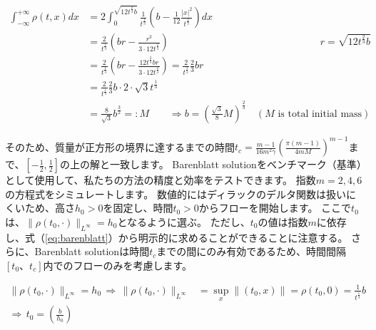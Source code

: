 \documentclass{jsarticle}
\theoremstyle{definition}
\begin{document}
\begin{align*}
    \int^{+\infty}_{-\infty} \rho(t, x)dx &= 2 \int^{\sqrt{12t^{\frac{2}{3}}b}}_0 \frac{1}{t^{\frac{1}{3}}}\left(b - \frac{1}{12} \frac{|x|^2}{t^{\frac{2}{3}}}\right)dx\\
                                            &= \frac{2}{t^{\frac{1}{3}}}\left(b r - \frac{r^3}{3 \cdot 12 t^{\frac{2}{3}}}\right) & r = \sqrt{12t^{\frac{2}{3}}b}\\
                                            &= \frac{2}{t^{\frac{1}{3}}}\left(b r - \frac{12t^{\frac{2}{3}}b r}{3 \cdot 12 t^{\frac{2}{3}}}\right) = \frac{2}{t^{\frac{1}{3}}}\frac{2}{3}br\\
                                            &= \frac{2}{t^{\frac{1}{3}}}\frac{2}{3}b \cdot 2\cdot \sqrt{3} t^{\frac{1}{3}}\\
                                            &= \frac{8}{\sqrt{3}}b^{\frac{3}{2}} =: M  \qquad \Longrightarrow b = \left(\frac{\sqrt{3}}{8} M \right)^{\frac{2}{3}} \quad(M \text{ is total initial mass})
\end{align*}



そのため、質量が正方形の境界に達するまでの時間$t_c = \frac{m - 1}{16 m^2 \gamma}(\frac{\pi(m - 1)}{4mM})^{m - 1}$まで、$[- \frac{1}{2}, \frac{1}{2}]$の上の解と一致します。
Barenblatt solutionをベンチマーク（基準）として使用して、私たちの方法の精度と効率をテストできます。
指数$m = 2, 4, 6$の方程式をシミュレートします。
数値的にはディラックのデルタ関数は扱いにくいため、高さ$h_0 > 0$を固定し、時間$t_0 > 0$からフローを開始します。
{\color{red}
    ここで$t_0$は、$\|\rho(t_0, \cdot)\|_{L^\infty} = h_0$となるように選ぶ。
}
ただし、$t_0$の値は指数$m$に依存し、式（\ref{eq:barenblatt}）から明示的に求めることができることに注意する。
さらに、Barenblatt solutionは時間$t_c$までの間にのみ有効であるため、時間間隔$[t_0、t_c]$内でのフローのみを考慮します。

\begin{align*}
    \|\rho(t_0, \cdot)\|_{L^\infty} = h_0 \,
    \Longrightarrow \,\|\rho(t_0, \cdot)\|_{L^\infty} &= \sup_x{\|(t_0, x)\|} = \rho(t_0, 0) = \frac{1}{t^{\frac{1}{3}}} b\\
    \Longrightarrow \, t_0 = \left(\frac{b}{h_0}\right)
\end{align*}
\end{document}
